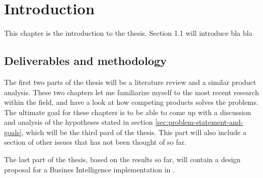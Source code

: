 \chapter{Introduction}
\label{chap:introduction}
This chapter is the introduction to the thesis. Section 1.1 will introduce bla bla
\clearpage




\section{Deliverables and methodology}
The first two parts of the thesis will be a literature review and a similar product analysis. These two chapters let me familiarize myself to the most recent research within the field, and have a look at how competing products solves the problems. The ultimate goal for these chapters is to be able to come up with a discussion and analysis of the hypotheses stated in section \ref{sec:problem-statement-and-goals}, which will be the third pard of the thesis. This part will also include a section of other issues that has not been thought of so far.

The last part of the thesis, based on the results so far, will contain a design proposal for a Busines Intelligence implementation in \genusSoftware. 

